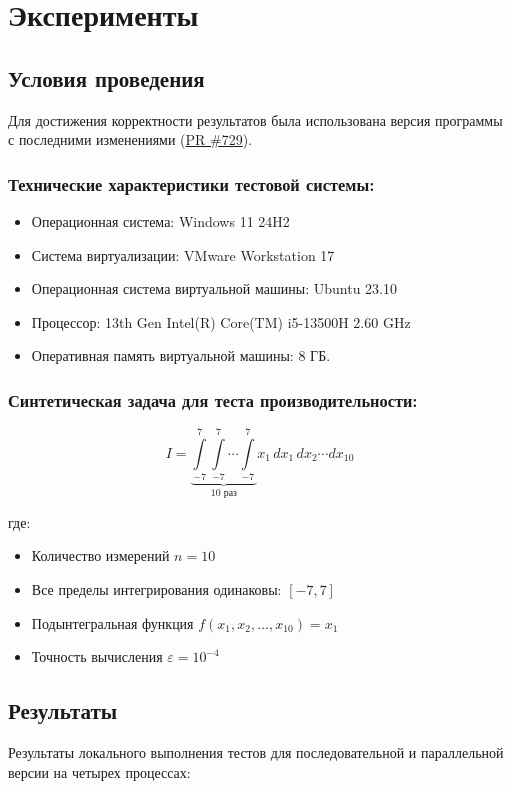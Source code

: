 \documentclass[12pt]{article}
\begin{document}
\newpage
\section{Эксперименты}
\subsection{Условия проведения}
Для достижения корректности результатов была использована версия программы с последними изменениями (\href{https://github.com/learning-process/ppc-2024-autumn/pull/729}{PR \#729}).

\subsubsection{Технические характеристики тестовой системы:} 
\begin{itemize}
    \item Операционная система: Windows 11 24H2
    \item Система виртуализации: VMware Workstation 17   
    \item Операционная система виртуальной машины: Ubuntu 23.10
    \item Процессор: 13th Gen Intel(R) Core(TM) i5-13500H 2.60 GHz
    \item Оперативная память виртуальной машины: 8 ГБ.
\end{itemize}

\subsubsection{Синтетическая задача для теста производительности:}
\[
I = \underbrace{\int\limits_{-7}^{7} \int\limits_{-7}^{7} \cdots \int\limits_{-7}^{7}}_{10\text{ раз}} x_1 \, dx_1 \, dx_2 \cdots dx_{10}
\]

где:
\begin{itemize}
    \item Количество измерений $n = 10$
    \item Все пределы интегрирования одинаковы: $[-7, 7]$
    \item Подынтегральная функция $f(x_1, x_2, \ldots, x_{10}) = x_1$
    \item Точность вычисления $\varepsilon = 10^{-4}$
\end{itemize}

\subsection{Результаты}
Результаты локального выполнения тестов для последовательной и параллельной версии на четырех процессах:
\end{document}
